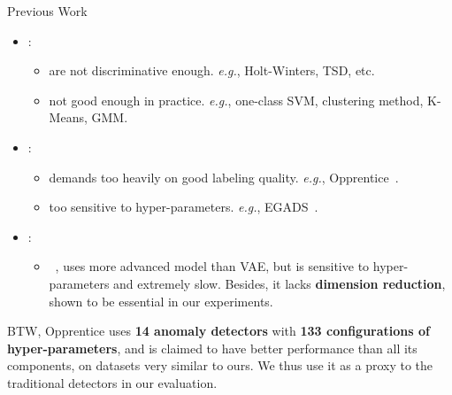 \documentclass[usenames,dvipsnames]{beamer}
\newcommand{\EG}{\textit{e.g.}}
\newcommand{\emphasis}[1]{\textbf{\textcolor{emphcolor}{#1}}}
\begin{document}
\begin{frame}{Previous Work}
  \vspace{-.5em}
  \begin{itemize}\setlength\itemsep{.2em}
    \item {}: \begin{itemize}\small\setlength\itemsep{0em}
        \item {} are not discriminative enough.  \EG, Holt-Winters, TSD, etc.
        \item {} not good enough in practice.  \EG, one-class SVM, clustering method, K-Means, GMM.
      \end{itemize}
      
    \item {}: \begin{itemize}\small\setlength\itemsep{0em}
        \item {} demands too heavily on good labeling quality.  \EG{}, Opprentice~\citep{opprentice}.
        \item {} too sensitive to hyper-parameters.  \EG{}, EGADS~\citep{egads}.
      \end{itemize}
    
    \item {}: \begin{itemize}\small\setlength\itemsep{0em}
        \item {}~\citep{vi-storn}, uses more advanced model than VAE, but is sensitive to hyper-parameters and extremely slow.  Besides, it lacks \emphasis{dimension reduction}, shown to be essential in our experiments.
      \end{itemize}
  \end{itemize}
  
  \small
  BTW, Opprentice uses \emphasis{14 anomaly detectors} with \emphasis{133 configurations of hyper-parameters}, and is claimed to have better performance than all its components, on datasets very similar to ours.
  We thus use it as a proxy to the traditional detectors in our evaluation.
\end{frame}


\end{document}
